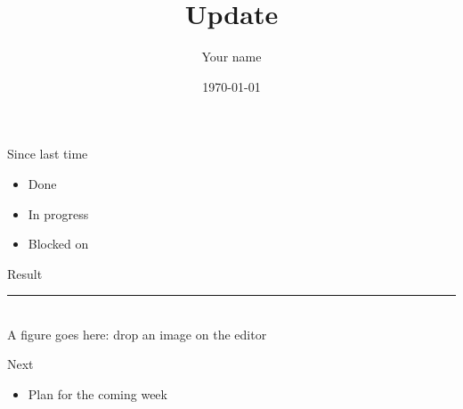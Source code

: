 \documentclass[aspectratio=169]{beamer}
\title{Update}
\author{Your name}
\date{\today}
\begin{document}
\begin{frame}[plain]
	\titlepage
\end{frame}

\begin{frame}{Since last time}
	\begin{itemize}
		\item Done
		\item In progress
		\item Blocked on
	\end{itemize}
\end{frame}

\begin{frame}{Result}
	\centering
	\rule{0.7\linewidth}{0.35\linewidth}\\[1mm]
	{\small A figure goes here: drop an image on the editor}
\end{frame}

\begin{frame}{Next}
	\begin{itemize}
		\item Plan for the coming week
	\end{itemize}
\end{frame}
\end{document}

